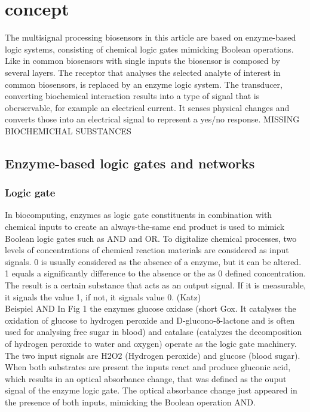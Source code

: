 \documentclass[runningheads]{llncs}
\begin{document}
\section{concept}

The multisignal processing biosensors in this article are based on enzyme-based logic systems, consisting of chemical logic gates mimicking Boolean operations. Like in common biosensors with single inputs the biosensor is composed by several layers. The receptor that analyses the selected analyte of interest in common biosensors, is replaced by an enzyme logic system.
The transducer, converting biochemical interaction results into a type of signal that is oberservable, for example an electrical current. It senses physical changes and converts those into an electrical signal to represent a yes/no response.
MISSING BIOCHEMICHAL SUBSTANCES

\subsection{Enzyme-based logic gates and networks}	
	\subsubsection{Logic gate}	
		In biocomputing, enzymes as logic gate constituents in combination with chemical inputs to create an always-the-same end product is used to mimick Boolean logic gates such as AND and OR. To digitalize chemical processes, two levels of concentrations of chemical reaction materials are considered as input signals. 0 is usually considered as the absence of a enzyme, but it can be altered. 1 equals a  significantly difference to the absence or the as 0 defined concentration.
		The result is a certain substance that acts as an output signal. If it is measurable, it signals the value 1, if not, it signals value 0.
	(Katz) \\
	
		Beispiel AND 
		In Fig 1 the enzymes glucose oxidase (short Gox. It catalyses the oxidation of glucose to hydrogen peroxide and D-glucono-δ-lactone and is often used for analysing free sugar in blood) and catalase (catalyzes the decomposition of hydrogen peroxide to water and oxygen) operate as the logic gate machinery. The two input signals are H2O2 (Hydrogen peroxide) and glucose (blood sugar). When both substrates are present the inputs react and produce gluconic acid, which results in an optical absorbance change, that was defined as the ouput signal of the enzyme logic gate. The optical absorbance change just appeared in the presence of both inputs, mimicking the Boolean operation AND. 
		
\end{document}
